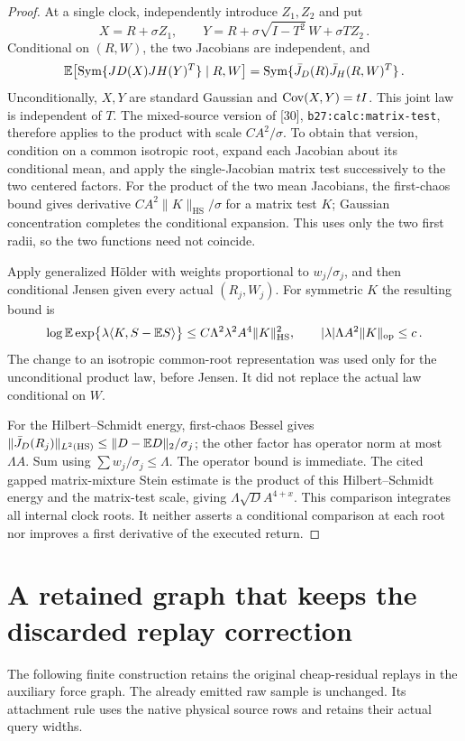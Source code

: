 \documentclass[11pt]{article}
\numberwithin{equation}{section}
\theoremstyle{remark}\newtheorem{remark}[theorem]{Remark}
\newcommand{\Sym}{\operatorname{Sym}}\newcommand{\HS}{\mathrm{HS}}
\newcommand{\op}{\mathrm{op}}\newcommand{\LL}{\Lambda}
\newcommand{\norm}[1]{\lVert#1\rVert}
\newcommand{\src}[1]{\texttt{\nolinkurl{#1}}}
\begin{document}
\begin{proof}
At a single clock, independently introduce $Z_1,Z_2$ and put
\[
 X=R+\sigma Z_1,\qquad
 Y=R+\sigma\sqrt{I-T^2}\,W+\sigma TZ_2\,.
\]
Conditional on $(R,W)$, the two Jacobians are independent, and
\[
 \E\bigl[\Sym\{JD(X)JH(Y)^T\}\mid R,W\bigr]
       =\Sym\{\bar J_D(R)\bar J_H(R,W)^T\}\,.
\]
Unconditionally, $X,Y$ are standard Gaussian and
$\operatorname{Cov}(X,Y)=tI$. This joint law is independent of $T$.
The mixed-source version of [30], \src{b27:calc:matrix-test},
therefore applies to the product with scale $C A^2/\sigma$.
To obtain that version, condition on a common isotropic root, expand
each Jacobian about its conditional mean, and apply the single-Jacobian
matrix test successively to the two centered factors. For the product
of the two mean Jacobians, the first-chaos bound gives derivative
$C A^2\norm K_{\HS}/\sigma$ for a matrix test $K$; Gaussian
concentration completes the conditional expansion. This uses only
the two first radii, so the two functions need not coincide.

Apply generalized H\"older with weights proportional to
$w_j/\sigma_j$, and then conditional Jensen given every actual
$(R_j,W_j)$. For symmetric $K$ the resulting bound is
\[
 \log\E\exp\bigl\{\lambda\langle K,S-\E S\rangle\bigr\}
 \le C\LL^2\lambda^2 A^4\norm K_{\HS}^2,
 \qquad |\lambda|\LL A^2\norm K_{\op}\le c\,.
\]
The change to an isotropic common-root representation was used only
for the unconditional product law, before Jensen. It did not replace
the actual law conditional on $W$.

For the Hilbert--Schmidt energy, first-chaos Bessel gives
$\norm{\bar J_D(R_j)}_{L^2(\HS)}
\le\norm{D-\E D}_2/\sigma_j$; the other factor has operator
norm at most $\LL A$. Sum using $\sum w_j/\sigma_j\le\LL$.
The operator bound is immediate. The cited gapped matrix-mixture
Stein estimate is the product of this Hilbert--Schmidt energy and
the matrix-test scale, giving $\LL\sqrt D A^{4+x}$.
This comparison integrates all internal clock roots. It neither
asserts a conditional comparison at each root nor improves a first
derivative of the executed return.
\end{proof}

\section{A retained graph that keeps the discarded replay correction}
\label{sec:replay-retention}
The following finite construction retains the original cheap-residual replays in the auxiliary force graph. The already emitted raw sample is unchanged. Its attachment rule uses the native physical source rows and retains their actual query widths.
\end{document}
